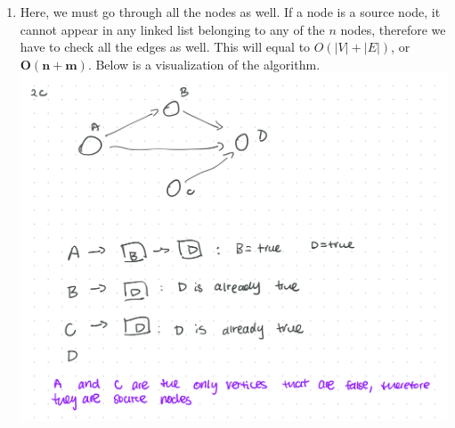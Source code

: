 \documentclass{article}
\begin{document}
\begin{enumerate}
\begin{enumerate}
            \item Here, we must go through all the nodes as well. If a node is a source node, it cannot appear in any linked list belonging to any of the $n$ nodes, therefore we have to check all the edges as well. This will equal to $O(|V| + |E|)$, or $\boxed{\mathbf{O(n + m)}}$. Below is a visualization of the algorithm.\\
            \includegraphics[scale=0.35]{2c.png}
        \end{enumerate}
    \end{enumerate}
\end{document}
